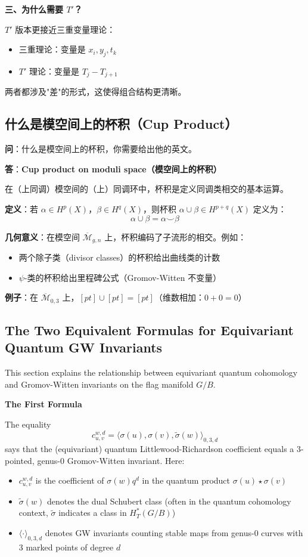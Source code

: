 \textbf{三、为什么需要 $T'$？}

$T'$ 版本更接近三重变量理论：
\begin{itemize}
\item 三重理论：变量是 $x_i, y_j, t_k$
\item $T'$ 理论：变量是 $T_j - T_{j+1}$
\end{itemize}

两者都涉及"差"的形式，这使得组合结构更清晰。

\subsection{什么是模空间上的杯积（Cup Product）}\label{sec:qa-cup-product-moduli-space}
\textbf{问}：什么是模空间上的杯积，你需要给出他的英文。

\textbf{答}：\textbf{Cup product on moduli space（模空间上的杯积）}

在（上同调）模空间的（上）同调环中，杯积是定义同调类相交的基本运算。

\textbf{定义}：若 $\alpha \in H^p(X)$，$\beta \in H^q(X)$，则杯积 $\alpha \cup \beta \in H^{p+q}(X)$ 定义为：
$$\alpha \cup \beta = \alpha \smile \beta$$

\textbf{几何意义}：在模空间 $\overline{\mathcal{M}}_{g,n}$ 上，杯积编码了子流形的相交。例如：
\begin{itemize}
\item 两个除子类（divisor classes）的杯积给出曲线类的计数
\item $\psi$-类的杯积给出里程碑公式（Gromov-Witten 不变量）
\end{itemize}

\textbf{例子}：在 $\overline{\mathcal{M}}_{0,3}$ 上，$[pt] \cup [pt] = [pt]$（维数相加：$0+0=0$）

\subsection{The Two Equivalent Formulas for Equivariant Quantum GW Invariants}\label{sec:qa-eqc-gw-invariant}

This section explains the relationship between equivariant quantum cohomology and Gromov-Witten invariants on the flag manifold $G/B$.

\textbf{The First Formula}

The equality
$$c_{u,v}^{w,d} = \langle \sigma(u), \sigma(v), \widetilde{\sigma}(w) \rangle_{0,3,d}$$
says that the (equivariant) quantum Littlewood-Richardson coefficient equals a 3-pointed, genus-0 Gromov-Witten invariant. Here:
\begin{itemize}
\item $c_{u,v}^{w,d}$ is the coefficient of $\sigma(w) q^d$ in the quantum product $\sigma(u) \star \sigma(v)$
\item $\widetilde{\sigma}(w)$ denotes the dual Schubert class (often in the quantum cohomology context, $\widetilde{\sigma}$ indicates a class in $H^*_T(G/B)$)
\item $\langle \cdot \rangle_{0,3,d}$ denotes GW invariants counting stable maps from genus-0 curves with 3 marked points of degree $d$
\end{itemize}

